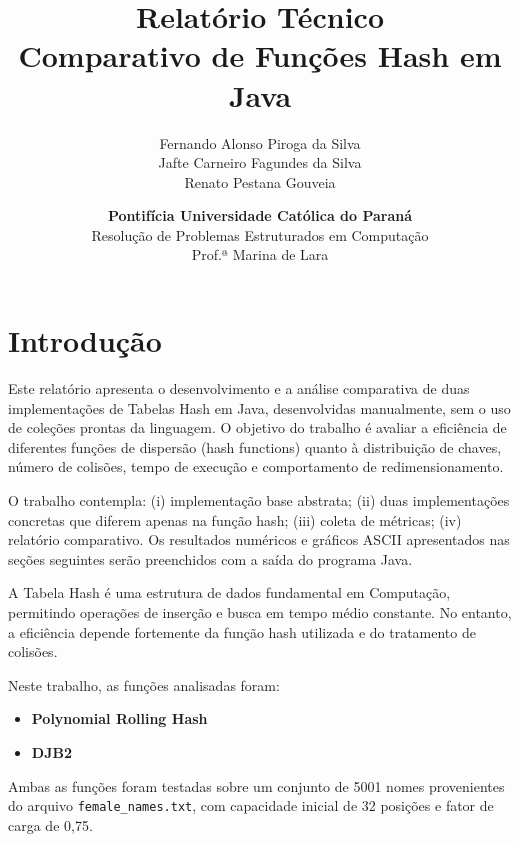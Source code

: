 \documentclass[12pt,a4paper]{abntex2}
\begin{document}
\title{Relatório Técnico \\ Comparativo de Funções Hash em Java}
\author{Fernando Alonso Piroga da Silva \\ Jafte Carneiro Fagundes da Silva \\ Renato Pestana Gouveia}
\date{\textbf{Pontifícia Universidade Católica do Paraná} \\ Resolução de Problemas Estruturados em Computação \\ Prof.ª Marina de Lara}
\maketitle

\tableofcontents
\newpage

\section{Introdução}
Este relatório apresenta o desenvolvimento e a análise comparativa de duas implementações de Tabelas Hash em Java, desenvolvidas manualmente, sem o uso de coleções prontas da linguagem. O objetivo do trabalho é avaliar a eficiência de diferentes funções de dispersão (hash functions) quanto à distribuição de chaves, número de colisões, tempo de execução e comportamento de redimensionamento.

O trabalho contempla: (i) implementação base abstrata; (ii) duas implementações concretas que diferem apenas na função hash; (iii) coleta de métricas; (iv) relatório comparativo. Os resultados numéricos e gráficos ASCII apresentados nas seções seguintes serão preenchidos com a saída do programa Java.


A Tabela Hash é uma estrutura de dados fundamental em Computação, permitindo operações de inserção e busca em tempo médio constante. No entanto, a eficiência depende fortemente da função hash utilizada e do tratamento de colisões.

Neste trabalho, as funções analisadas foram:

\begin{itemize}
  \item \textbf{Polynomial Rolling Hash}
  \item \textbf{DJB2}
\end{itemize}

Ambas as funções foram testadas sobre um conjunto de 5001 nomes provenientes do arquivo \texttt{female\_names.txt}, com capacidade inicial de 32 posições e fator de carga de 0,75.
\end{document}
